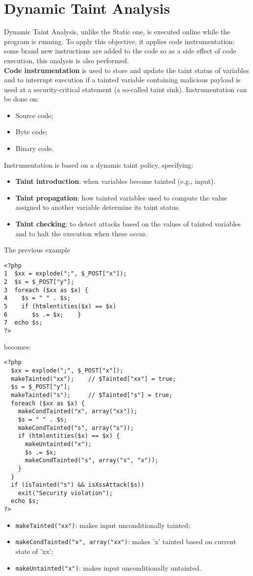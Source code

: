 \documentclass[a4paper, 10pt, titlepage]{article}
\begin{document}
\section{Dynamic Taint Analysis}
Dynamic Taint Analysis, unlike the Static one, is executed online while the program is running. To apply this objective, it applies code instrumentation: some brand new instructions are added to the code so as a side effect of code execution, this analysis is also performed. \medskip\\
\textbf{Code instrumentation} is used to store and update the taint status of variables and to interrupt execution if a tainted variable containing malicious payload is used at a security-critical statement (a so-called taint sink).
Instrumentation can be done on:
\begin{itemize}
\item Source code;
\item Byte code;
\item Binary code.
\end{itemize}
Instrumentation is based on a dynamic taint policy, specifying:
\begin{itemize}
\item \textbf{Taint introduction}: when variables become tainted (e.g., input).
\item \textbf{Taint propagation}: how tainted variables used to compute the value assigned to another variable determine its taint status.
\item \textbf{Taint checking}: to detect attacks based on the values of tainted variables and to halt the execution when these occur.
\end{itemize}
The previous example
\begin{lstlisting}
<?php 
1  $xx = explode(";", $_POST["x"]); 
2  $s = $_POST["y"]; 
3  foreach ($xx as $x) { 
4    $s = " " . $s; 
5    if (htmlentities($x) == $x) 
6       $s .= $x;    } 
7  echo $s; 
?>
\end{lstlisting}
becomes:
\begin{small}
\begin{lstlisting}
<?php
  $xx = explode(";", $_POST["x"]);
  makeTainted("xx"); 	// $Tainted["xx"] = true;
  $s = $_POST["y"];
  makeTainted("s");		// $Tainted["s"] = true;
  foreach ($xx as $x) {
    makeCondTainted("x", array("xx"));
    $s = " " . $s;
    makeCondTainted("s", array("s"));
    if (htmlentities($x) == $x) {
      makeUntainted("x");
      $s .= $x;
      makeCondTainted("s", array("s", "x"));
    }
  }
  if (isTainted("s") && isXssAttack($s))
    exit("Security violation");
  echo $s;
?>
\end{lstlisting}
\end{small}
\begin{itemize}
\item \lstinline|makeTainted("xx")|: makes input unconditionally tainted;
\item \lstinline|makeCondTainted("x", array("xx")|: makes 'x' tainted based on current state of 'xx';
\item \lstinline|makeUntainted("x")|: makes input unconditionally untainted.
\end{itemize}
\end{document}
